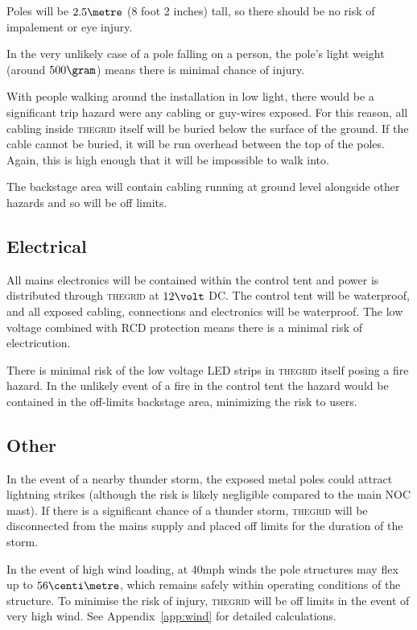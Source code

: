 \documentclass[12pt]{article} %
\newcommand{\thegrid}{\textsc{the\textperiodcentered grid}\xspace}
\begin{document}
Poles will be $2.5\metre$ (8 foot 2 inches) tall, so there should be no risk of
impalement or eye injury.

In the very unlikely case of a pole falling on a person, the pole's light
weight (around $500\gram$) means there is minimal chance of injury.

With people walking around the installation in low light, there would be a
significant trip hazard were any cabling or guy-wires exposed.  For this
reason, all cabling inside \thegrid itself will be buried below the surface of
the ground.  If the cable cannot be buried, it will be run overhead between the
top of the poles.  Again, this is high enough that it will be impossible to
walk into.

The backstage area will contain cabling running at ground level alongside other
hazards and so will be off limits.

\subsection{Electrical}
All mains electronics will be contained within the control tent and power is
distributed through \thegrid at $12\volt$ DC\@.  The control tent will be
waterproof, and all exposed cabling, connections and electronics will be
waterproof.  The low voltage combined with RCD protection means there is a
minimal risk of electricution.

There is minimal risk of the low voltage LED strips in \thegrid itself posing a
fire hazard.  In the unlikely event of a fire in the control tent the hazard
would be contained in the off-limits backstage area, minimizing the risk to
users.

\subsection{Other}
In the event of a nearby thunder storm, the exposed metal poles could attract
lightning strikes (although the risk is  likely negligible compared to the main
NOC mast).  If there is a significant chance of a thunder storm, \thegrid will
be disconnected from the mains supply and placed off limits for the duration of
the storm.

In the event of high wind loading, at 40mph winds the pole structures may flex
up to $56\centi\metre$, which remains safely within operating conditions of the
structure. To minimise the risk of injury, \thegrid will be off limits in the
event of very high wind.  See Appendix~\ref{app:wind} for detailed
calculations.
\end{document}
